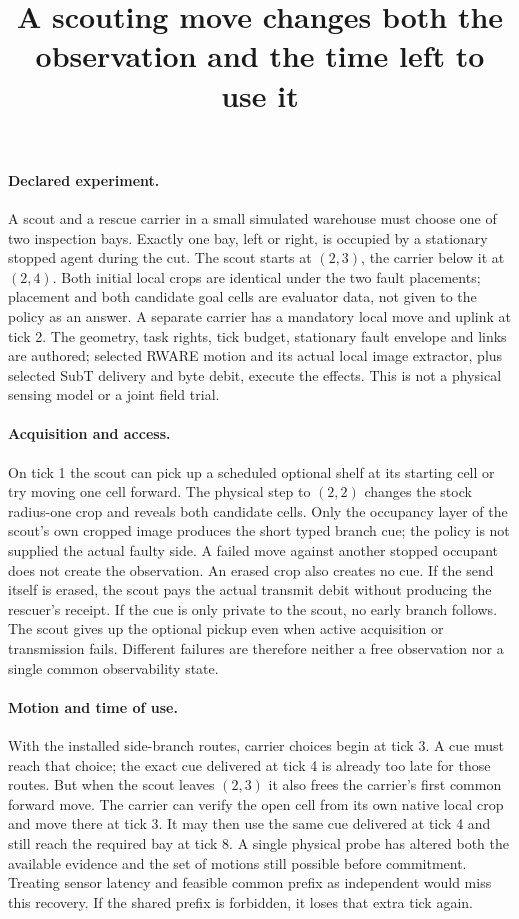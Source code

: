 \documentclass[11pt]{article}
\title{A scouting move changes both the observation and the time left to use it}
\author{}\date{}
\begin{document}
\maketitle

\paragraph{Declared experiment.}
A scout and a rescue carrier in a small simulated warehouse must choose
one of two inspection bays. Exactly one bay, left or right, is occupied
by a stationary stopped agent during the cut. The scout starts at
\((2,3)\), the carrier below it at \((2,4)\). Both initial local crops
are identical under the two fault placements; placement and both
candidate goal cells are evaluator data, not given to the policy as an
answer. A separate carrier has a mandatory local move and uplink at tick 2.
The geometry, task rights, tick budget, stationary fault envelope and
links are authored; selected RWARE motion and its actual local image
extractor, plus selected SubT delivery and byte debit, execute the
effects. This is not a physical sensing model or a joint field trial.

\paragraph{Acquisition and access.}
On tick 1 the scout can pick up a scheduled optional shelf at its
starting cell or try moving one cell forward. The physical step to
\((2,2)\) changes the stock radius-one crop and reveals both candidate
cells. Only the occupancy layer of the scout's own cropped image
produces the short typed branch cue; the policy is not supplied the
actual faulty side. A failed move against another stopped occupant
does not create the observation. An erased crop also creates no cue.
If the send itself is erased, the scout pays the actual transmit debit
without producing the rescuer's receipt. If the cue is only private to
the scout, no early branch follows. The scout gives up the optional
pickup even when active acquisition or transmission fails. Different
failures are therefore neither a free observation nor a single
common observability state.

\paragraph{Motion and time of use.}
With the installed side-branch routes, carrier choices begin at tick 3.
A cue must reach that choice; the exact cue delivered at tick 4 is
already too late for those routes. But when the scout leaves \((2,3)\)
it also frees the carrier's first common forward move. The carrier
can verify the open cell from its own native local crop and move there
at tick 3. It may then use the same cue delivered at tick 4 and still
reach the required bay at tick 8. A single physical probe has altered
both the available evidence and the set of motions still possible
before commitment. Treating sensor latency and feasible common prefix
as independent would miss this recovery. If the shared prefix is
forbidden, it loses that extra tick again.
\end{document}
